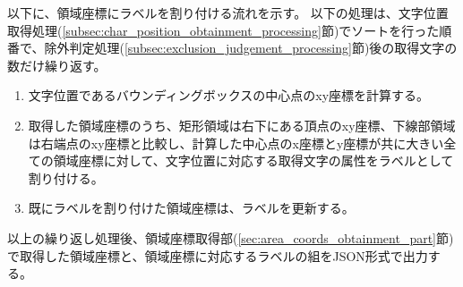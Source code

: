 以下に、領域座標にラベルを割り付ける流れを示す。
以下の処理は、文字位置取得処理(\ref{subsec:char_position_obtainment_processing}節)でソートを行った順番で、除外判定処理(\ref{subsec:exclusion_judgement_processing}節)後の取得文字の数だけ繰り返す。

\begin{enumerate}
    \item 文字位置であるバウンディングボックスの中心点のxy座標を計算する。
    \item 取得した領域座標のうち、矩形領域は右下にある頂点のxy座標、下線部領域は右端点のxy座標と比較し、計算した中心点のx座標とy座標が共に大きい全ての領域座標に対して、文字位置に対応する取得文字の属性をラベルとして割り付ける。
    \item 既にラベルを割り付けた領域座標は、ラベルを更新する。
\end{enumerate}

以上の繰り返し処理後、領域座標取得部(\ref{sec:area_coords_obtainment_part}節)で取得した領域座標と、領域座標に対応するラベルの組をJSON形式で出力する。
